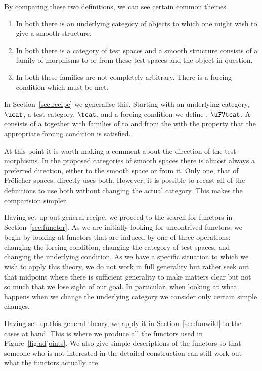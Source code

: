 \documentclass[%
12pt,%
arxiv,%
defaults
]{myclass}
\begin{document}
By comparing these two definitions, we can see certain common themes.

\begin{enumerate}
\item In both there is an underlying category of objects to which one might wish to give a smooth structure.

\item In both there is a category of test spaces and a smooth structure consists of a family of morphisms to or from these test spaces and the object in question.

\item In both these families are not completely arbitrary.
There is a forcing condition which must be met.
\end{enumerate}

In Section~\ref{sec:recipe} we generalise this.
Starting with an underlying category, \(\ucat\), a test category, \(\tcat\), and a forcing condition we define \uFVtcat, \(\uFVtcat\).
A \uFVtobj consists of a \uobj together with families of \umors to and from the \tobjs with the property that the appropriate forcing condition is satisfied.

At this point it is worth making a comment about the direction of the test morphisms.
In the proposed categories of smooth spaces there is almost always a preferred direction, either to the smooth space or from it.
Only one, that of Fr\"olicher spaces, directly uses both.
However, it is possible to recast all of the definitions to use both without changing the actual category.
This makes the comparision simpler.

\medskip

Having set up out general recipe, we proceed to the search for functors in Section~\ref{sec:functor}.
As we are initially looking for uncontrived functors, we begin by looking at functors that are induced by one of three operations: changing the forcing condition, changing the category of test spaces, and changing the underlying condition.
As we have a specific situation to which we wish to apply this theory, we do not work in full generality but rather seek out that midpoint where there is sufficient generality to make matters clear but not so much that we lose sight of our goal.
In particular, when looking at what happens when we change the underlying category we consider only certain simple changes.

Having set up this general theory, we apply it in Section~\ref{sec:funwild} to the cases at hand.
This is where we produce all the functors used in Figure~\ref{fig:adjoints}.
We also give simple descriptions of the functors so that someone who is not interested in the detailed construction can still work out what the functors actually are.
\end{document}

